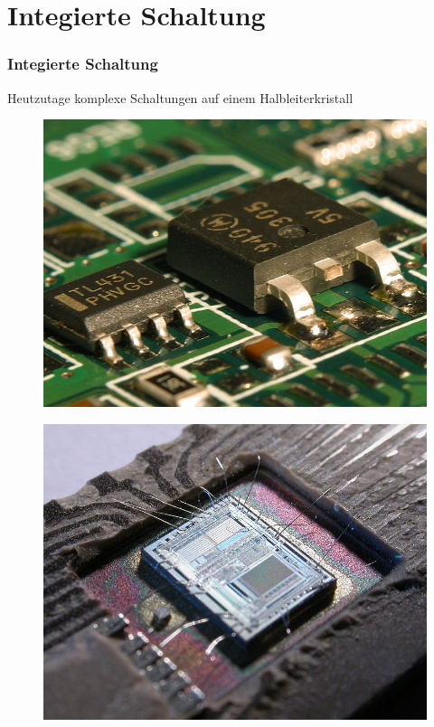 \section*{Integierte Schaltung}
\begin{frame}
  \frametitle{Integierte Schaltung}
  Heutzutage komplexe Schaltungen auf einem Halbleiterkristall
  \begin{minipage}{0.3\textwidth}
    \begin{figure}
      \includegraphics[width=\textwidth,height=.6\textheight,keepaspectratio]{e13/IC.jpg}
    \end{figure}
  \end{minipage}
  \hspace{0.5cm}
  \begin{minipage}{0.5\textwidth}
    \vspace{0.5cm}
    \begin{center}
      \begin{figure}
        \includegraphics[width=\textwidth,height=.6\textheight,keepaspectratio]{e13/IC2.jpg}

\end{figure}
\end{center}
\end{minipage}
\end{frame}
